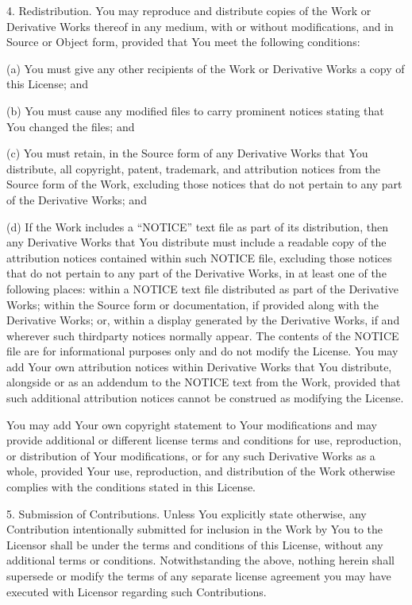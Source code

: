 \documentclass[letterpaper,10pt,english]{sphinxmanual}
\begin{document}
4. Redistribution. You may reproduce and distribute copies of the
Work or Derivative Works thereof in any medium, with or without
modifications, and in Source or Object form, provided that You
meet the following conditions:

(a) You must give any other recipients of the Work or
Derivative Works a copy of this License; and

(b) You must cause any modified files to carry prominent notices
stating that You changed the files; and

(c) You must retain, in the Source form of any Derivative Works
that You distribute, all copyright, patent, trademark, and
attribution notices from the Source form of the Work,
excluding those notices that do not pertain to any part of
the Derivative Works; and

(d) If the Work includes a “NOTICE” text file as part of its
distribution, then any Derivative Works that You distribute must
include a readable copy of the attribution notices contained
within such NOTICE file, excluding those notices that do not
pertain to any part of the Derivative Works, in at least one
of the following places: within a NOTICE text file distributed
as part of the Derivative Works; within the Source form or
documentation, if provided along with the Derivative Works; or,
within a display generated by the Derivative Works, if and
wherever such third\sphinxhyphen{}party notices normally appear. The contents
of the NOTICE file are for informational purposes only and
do not modify the License. You may add Your own attribution
notices within Derivative Works that You distribute, alongside
or as an addendum to the NOTICE text from the Work, provided
that such additional attribution notices cannot be construed
as modifying the License.

You may add Your own copyright statement to Your modifications and
may provide additional or different license terms and conditions
for use, reproduction, or distribution of Your modifications, or
for any such Derivative Works as a whole, provided Your use,
reproduction, and distribution of the Work otherwise complies with
the conditions stated in this License.

5. Submission of Contributions. Unless You explicitly state otherwise,
any Contribution intentionally submitted for inclusion in the Work
by You to the Licensor shall be under the terms and conditions of
this License, without any additional terms or conditions.
Notwithstanding the above, nothing herein shall supersede or modify
the terms of any separate license agreement you may have executed
with Licensor regarding such Contributions.
\end{document}
